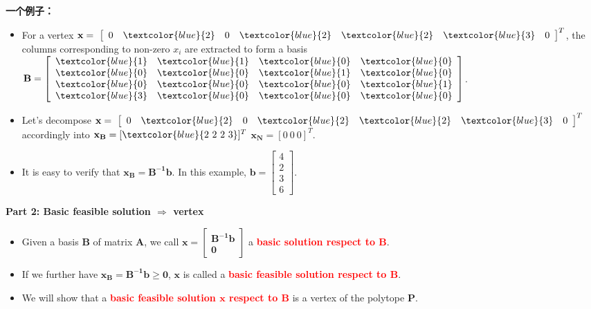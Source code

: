 \textbf{一个例子：}
\begin{itemize}
 \item For a vertex $\mathbf{x}= \ \left[ \begin{array}{ccccccc}
               0 &\textcolor{blue}{2} &0 &\textcolor{blue}{2} &\textcolor{blue}{2} &\textcolor{blue}{3} &0
               \end{array}
               \right]^T$, the columns corresponding to non-zero $x_i$ are extracted to form a basis
$ \mathbf{B} = \left[
			\begin{array}{cccc}
		 \textcolor{blue}{1} &  \textcolor{blue}{1} & \textcolor{blue}{0} & \textcolor{blue}{0}  \\
		 \textcolor{blue}{0} &  \textcolor{blue}{0} & \textcolor{blue}{1} & \textcolor{blue}{0}  \\
		 \textcolor{blue}{0} &  \textcolor{blue}{0} & \textcolor{blue}{0} & \textcolor{blue}{1}  \\
		 \textcolor{blue}{3} &  \textcolor{blue}{0} & \textcolor{blue}{0} & \textcolor{blue}{0}
			\end{array}
			\right]$.
\item Let's decompose $\mathbf{x}= \ \left[ \begin{array}{ccccccc}
               0 &\textcolor{blue}{2} &0 &\textcolor{blue}{2} &\textcolor{blue}{2} &\textcolor{blue}{3} &0
               \end{array}
               \right]^T
$ accordingly into  $ \mathbf{x_B}=[\textcolor{blue}{2\ 2\ 2\ 3}]^T$  $\mathbf{x_N}=[0\ 0\ 0]^T$.
\item It is easy to verify that $\mathbf{x_B = B^{-1}b}$. In this example, $\mathbf{b} = \left[ \begin{array}{c}
						4\\
						2\\
						3\\
						6
					 	\end{array} \right]$.

 \end{itemize}

\textbf{ Part 2: Basic feasible  solution  $\Rightarrow$ vertex}
\begin{itemize}
\item Given a  basis $\mathbf{B}$ of matrix $\mathbf{A}$,  we call $\mathbf{x=\left[\begin{array}{c}\mathbf{B^{-1}b}\\\mathbf{0}\end{array}\right]}$ a  \textcolor{red}{\bf basic solution respect to $\mathbf{B}$}.
 \item If we further have $\mathbf{x_B = B^{-1}b \geq 0 }$, $\mathbf{x}$ is called  a \textcolor{red}{\bf basic feasible solution respect to $\mathbf{B}$}.
 \item We will show that a \textcolor{red}{\bf basic feasible solution $\mathbf{x}$ respect to $\mathbf{B}$} is a vertex of the polytope $\mathbf{P}$.
  \end{itemize}

